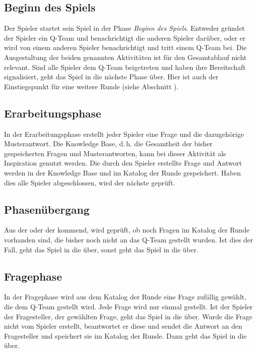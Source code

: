 \documentclass[a4paper,11pt,listof=numbered,glossary=totoc,parskip=half,toc=bib]{scrreprt}
\newcommand{\dash}{\mbox{d.\,h.}\xspace}
\begin{document}
	
	\subsection{Beginn des Spiels}
	\label{subsec:beginndesspiels}
	Der Spieler startet sein Spiel in der Phase \textit{Beginn des Spiels}. Entweder gründet der Spieler ein Q-Team und benachrichtigt die anderen Spieler darüber, oder er wird von einem anderen Spieler benachrichtigt und tritt einem Q-Team bei. 
	Die Ausgestaltung der beiden genannten Aktivitäten ist für den Gesamtablauf nicht relevant. Sind alle Spieler dem Q-Team beigetreten und haben ihre Bereitschaft signalisiert, geht das Spiel in die nächste Phase über. Hier ist auch der Einstiegspunkt für eine weitere Runde (siehe Abschnitt ).
	
	\subsection{Erarbeitungsphase}
	\label{subsec:erarbeitungsphase}
	In der Erarbeitungsphase erstellt jeder Spieler eine Frage und die dazugehörige Musterantwort. Die Knowledge Base, \dash die Gesamtheit der bisher gespeicherten Fragen und Musterantworten, kann bei dieser Aktivität als Inspiration genutzt werden. Die durch den Spieler erstellte Frage und Antwort werden in der Knowledge Base und im Katalog der Runde gespeichert. Haben dies alle Spieler abgeschlossen, wird der nächste  geprüft.
	
	\subsection{Phasenübergang}
	\label{subsec:phasenuebergang}
	Aus der  oder der  kommend, wird geprüft, ob noch Fragen im Katalog der Runde vorhanden sind, die bisher noch nicht an das Q-Team gestellt wurden. Ist dies der Fall, geht das Spiel in die  über, sonst geht das Spiel in die  über.
	
	\subsection{Fragephase}
	\label{subsec:fragephase}
	In der Fragephase wird aus dem Katalog der Runde eine Frage zufällig gewählt, die dem Q-Team gestellt wird. Jede Frage wird nur einmal gestellt. Ist der Spieler der Fragesteller, der gewählten Frage, geht das Spiel in die  über. Wurde die Frage nicht vom Spieler erstellt, beantwortet er diese und sendet die Antwort an den Fragesteller und speichert sie im Katalog der Runde. Dann geht das Spiel in die  über.
	
\end{document}
